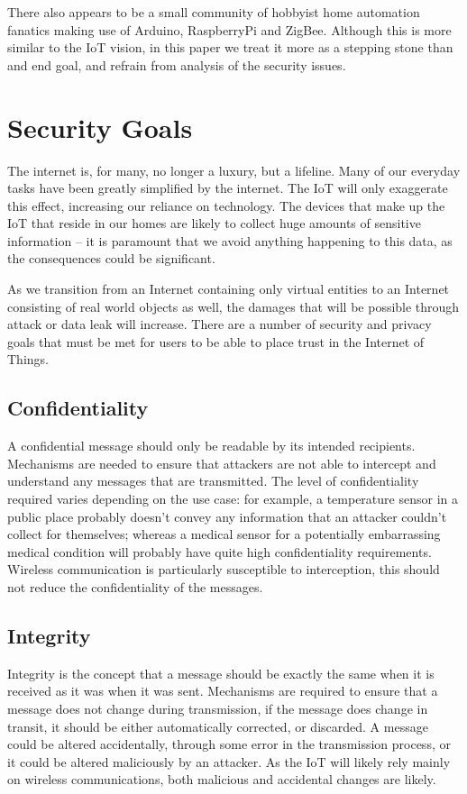 \documentclass[12pt,journal,compsoc]{IEEEtran}
\begin{document}
There also appears to be a small community of hobbyist home automation fanatics
making use of Arduino, RaspberryPi and ZigBee. Although this is more similar to
the IoT vision, in this paper we treat it more as a stepping stone than and end
goal, and refrain from analysis of the security issues.

\section{Security Goals}
The internet is, for many, no longer a luxury, but a lifeline. Many of our
everyday tasks have been greatly simplified by the internet. The IoT will only
exaggerate this effect, increasing our reliance on technology. The devices that
make up the IoT that reside in our homes are likely to collect huge amounts of
sensitive information -- it is paramount that we avoid anything happening to
this data, as the consequences could be significant. 

As we transition from an Internet containing only virtual entities to an
Internet consisting of real world objects as well, the damages that will be
possible through attack or data leak will increase. There are a number of
security and privacy goals that must be met for users to be able to place trust
in the Internet of Things.

\subsection{Confidentiality}
A confidential message should only be readable by its intended recipients.
Mechanisms are needed to ensure that attackers are not able to intercept and
understand any messages that are transmitted. The level of confidentiality
required varies depending on the use case: for example, a temperature sensor in
a public place probably doesn't convey any information that an attacker
couldn't collect for themselves; whereas a medical sensor for a potentially
embarrassing medical condition will probably have quite high confidentiality
requirements. Wireless communication is particularly susceptible to
interception, this should not reduce the confidentiality of the messages.  

\subsection{Integrity}
Integrity is the concept that a message should be exactly the same when it is
received as it was when it was sent. Mechanisms are required to ensure that a
message does not change during transmission, if the message does change in
transit, it should be either automatically corrected, or discarded. A message
could be altered accidentally, through some error in the transmission process,
or it could be altered maliciously by an attacker. As the IoT will likely rely
mainly on wireless communications, both malicious and accidental changes are likely. 
\end{document}
